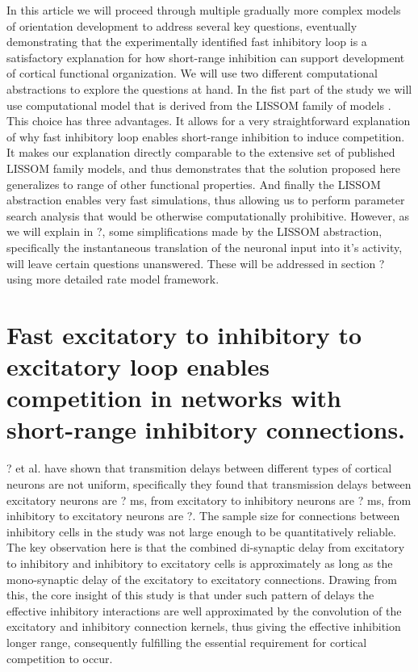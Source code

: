 \documentclass[a4paper,10pt]{article}
\begin{document}
In this article we will proceed through multiple gradually more complex models of orientation development to address several key questions,
eventually demonstrating that the experimentally identified fast inhibitory loop is a satisfactory explanation for how short-range 
inhibition can support development of cortical functional organization. We will use two different computational abstractions 
to explore the questions at hand. In the fist part of the study we will use computational model that is derived from the LISSOM 
family of models \cite{CMVC}. This choice has three advantages. It allows for a very straightforward explanation of why 
fast inhibitory loop enables short-range inhibition to induce competition. It makes our explanation directly comparable to the 
extensive set of published LISSOM family models, and thus demonstrates that the solution proposed here generalizes to range of other 
functional properties. And finally the LISSOM abstraction enables very fast simulations, thus allowing us to perform 
parameter search analysis that would be otherwise computationally prohibitive. However, as we will explain in ?, some simplifications
made by the LISSOM abstraction, specifically the instantaneous translation of the neuronal input into it's activity, will leave 
certain questions unanswered. These will be addressed in section ? using more detailed rate model framework.


\section{Fast excitatory to inhibitory to excitatory loop enables competition in networks with short-range inhibitory connections.}

? et al. have shown that transmition delays between different types of cortical neurons are not uniform, specifically they found that transmission delays 
between excitatory neurons are ? ms, from excitatory to inhibitory neurons are ? ms, from inhibitory to excitatory neurons are ?. The sample size for connections
between inhibitory cells in the study was not large enough to be quantitatively reliable. The key observation here is that the 
combined di-synaptic delay from excitatory to inhibitory and inhibitory to excitatory cells is approximately as long as the mono-synaptic delay
of the excitatory to excitatory connections. Drawing from this, the core insight of this study is that under such pattern of delays
the effective inhibitory interactions are well approximated by the convolution of the excitatory and inhibitory connection kernels, thus 
giving the effective inhibition longer range, consequently fulfilling the essential requirement for cortical competition to occur.
\end{document}
